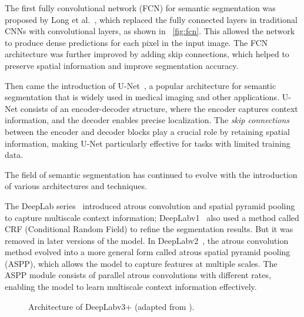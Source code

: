 The first fully convolutional network (FCN) for semantic segmentation was proposed by Long et al.~\cite{fsss_fcn}, which replaced the fully connected layers in traditional CNNs with convolutional layers, as shown in ~\autoref{fig:fcn}. This allowed the network to produce dense predictions for each pixel in the input image. The FCN architecture was further improved by adding skip connections, which helped to preserve spatial information and improve segmentation accuracy.


Then came the introduction of U-Net~\cite{fsss_unet}, a popular architecture for semantic segmentation that is widely used in medical imaging and other applications. U-Net consists of an encoder-decoder structure, where the encoder captures context information, and the decoder enables precise localization. The \emph{skip connections} between the encoder and decoder blocks play a crucial role by retaining spatial information, making U-Net particularly effective for tasks with limited training data.

The field of semantic segmentation has continued to evolve with the introduction of various architectures and techniques.

The DeepLab series~\cite{fsss_deeplabv1, fsss_deeplabv2, fsss_deeplabv3,fsss_deeplabv3plus} introduced atrous convolution and spatial pyramid pooling to capture multiscale context information; DeepLabv1~\cite{fsss_deeplabv1} also used a method called CRF (Conditional Random Field) to refine the segmentation results. But it was removed in later versions of the model. In DeepLabv2~\cite{fsss_deeplabv2}, the atrous convolution method evolved into a more general form called atrous spatial pyramid pooling (ASPP), which allows the model to capture features at multiple scales. The ASPP module consists of parallel atrous convolutions with different rates, enabling the model to learn multiscale context information effectively.

\begin{figure}[htbp]
    \centering
    \caption{Architecture of DeepLabv3+ (adapted from \cite{fsss_deeplabv3plus}).}
    \label{fig:dlv3+}
\end{figure}

